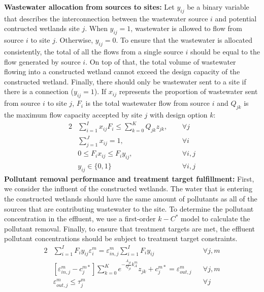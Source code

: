 \documentclass[preprint,12pt,authoryear]{elsarticle}
\begin{document}
\textbf{Wastewater allocation from sources to sites:} Let $y_{ij}$ be a binary variable that describes the interconnection between the wastewater source $i$ and potential contructed wetlands site $j$. When $y_{ij} = 1$, wastewater is allowed to flow from source $i$ to site $j$. Otherwise, $y_{ij} = 0$. To ensure that the wastewater is allocated consistently, the total of all the flows from a single source $i$ should be equal to the flow generated by source $i$. On top of that, the total volume of wastewater flowing into a constructed wetland cannot exceed the design capacity of the constructed wetland. Finally, there should only be wastewater sent to a site if there is a connection ($y_{ij} = 1$). If $x_{ij}$ represents the proportion of wastewater sent from source $i$ to site $j$, $F_{i}$ is the total wastewater flow from source $i$ and $Q_{jk}$ is the maximum flow capacity accepted by site $j$ with design option $k$:
\begin{alignat*}{2}
    &\sum_{i=1}^{I}x_{ij}F_{i}\leq \sum_{k=0}^{K}Q_{jk}z_{jk},~~ &&\forall j\label{eq:CWcapacity}\\
	&\sum_{j=1}^{J}x_{ij}=1, &&\forall i \nonumber\\
	&0 \leq F_ix_{ij}\leq F_iy_{ij},&&\forall i,j\nonumber\\
	& y_{ij}\in\{0,1\}&&\forall i,j\nonumber
\end{alignat*}
\textbf{Pollutant removal performance and treatment target fulfillment:} First, we consider the influent of the constructed wetlands. The water that is entering the constructed wetlands should have the same amount of pollutants as all of the sources that are contributing wastewater to the site. To determine the pollutant concentration in the effluent, we use a first-order $k-C^*$ model \citep{rousseau2004model} to calculate the pollutant removal. Finally, to ensure that treatment targets are met, the effluent pollutant concentrations should be subject to treatment target constraints. 
\begin{alignat*}{2}
	&{\sum_{i=1}^{I}F_{i}y_{ij}\varepsilon_{i}^{m}} = \varepsilon_{in,j}^{m}{\sum_{i=1}^{I}F_{i}y_{ij}} &&\forall j,m\\
	&[\varepsilon_{in,j}^{m}-{c}_{j}^{m*}]\sum_{k=0}^{K}e^{-\frac{A_{jk}}{Q_{jk}}k_{A}^{m}}z_{jk}+c_{j}^{m*} = \varepsilon_{out,j}^{m} &&\forall j,m\\
	&\varepsilon_{out,j}^{m}\leq \tau_{j}^{m}~~~&&\forall j\\
\end{alignat*}
\end{document}
